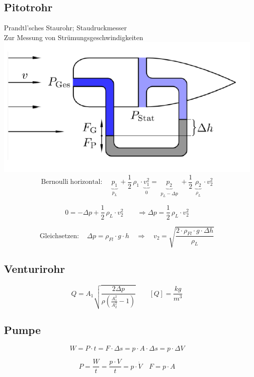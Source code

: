 \subsection{Pitotrohr}
Prandtl'sches Staurohr; Staudruckmesser \\
Zur Messung von Strümungsgeschwindigkeiten \\

\includegraphics[width=0.7\linewidth]{Bilder/pitotrohr} \\

$$ \mathrm{Bernoulli \; horizontal:} \quad \boxed{  \underbrace{p_1}_{\substack{p_L}} + \frac{1}{2} \, \rho_1 \cdot \underbrace{v_1^2}_{\substack{0}} =  \underbrace{p_2}_{\substack{p_L - \Delta p}} + \frac{1}{2} \, \underbrace{\rho_2}_{\substack{\rho_L}} \cdot v_2^2} $$

$$ 0 = - \Delta p + \frac{1}{2} \, \rho_L \cdot v_2^2 \qquad \Rightarrow \Delta p =\frac{1}{2} \, \rho_L \cdot v_2^2 $$

$$ \mathrm{Gleichsetzen: } \quad \Delta p = \rho_{Fl} \cdot g \cdot h \quad \Rightarrow \quad v_2 = \sqrt{\frac{2 \cdot \rho_{Fl} \cdot g \cdot \Delta h}{\rho_L}} $$


\subsection{Venturirohr}
$$  \boxed{ Q = A_1 \sqrt{\frac{2 \Delta p}{\rho \left( \frac{A_1^2}{A_2^2} - 1\right)}}  \quad \quad [Q] = \frac{kg}{m^3} } $$


\subsection{Pumpe}
$$ \boxed{ W = P \cdot t = F \cdot \Delta s = p \cdot A \cdot \Delta s = p \cdot \Delta V }  $$

$$ \boxed{ P =  \frac{W}{t} = \frac{p \cdot V}{t} = p  \cdot  \dot{V} }  \quad  \boxed{ F = p \cdot A } $$





